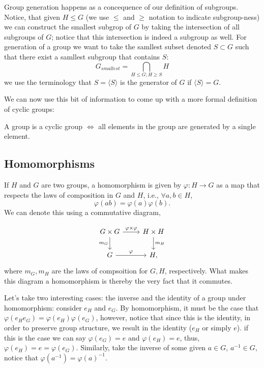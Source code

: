 \documentclass{article}
\begin{document}
\begin{definition}
  Group generation happens as a concequence of our definition of subgroups. Notice, that given \( H \le G \) (we use \( \le\) and \(\ge \) notation to indicate subgroup-ness) we can construct the smallest subgrop of \( G \) by taking the intersection of all subgroups of \( G \); notice that this intersection is indeed a subgroup as well. For generation of a group we want to take the samllest subset denoted \( S \subset G\) such that there exist a samllest subgroup that contains \( S \):
  \begin{displaymath}
    G_{smallest}=\bigcap_{H\le G; H\ge S} H
  \end{displaymath}
  we use the terminology that \( S= \langle S \rangle  \) is the generator of \( G \) if \( \langle S \rangle = G \).
\end{definition}

We can now use this bit of information to come up with a more formal definition of cyclic groups:

\begin{definition}
  A group is a cyclic group \( \iff \) all elements in the group are generated by a single element.
\end{definition}

\subsection{Homomorphisms}
\begin{definition}[Homomorphisms]
  If \( H \) and \( G \) are two groups, a homomorphism is given by \( \varphi : H \to  G \) as a map that respects the laws of composition in \( G \) and \( H \), i.e., \( \forall a,b\in H \),
  \begin{displaymath}
    \varphi (ab)=\varphi (a)\varphi (b).
  \end{displaymath}
  We can denote this using a commutative diagram,

  \[
    \begin{tikzcd}
G \times  G\arrow{r}{\varphi \times  \varphi } \arrow[swap]{d}{m_G} & H \times  H \arrow{d}{m_H} \\%
G \arrow{r}{\varphi}& H,
\end{tikzcd}
\] 
where \( m_G, m_H \) are the laws of compsoition for \( G,H \), respectively. What makes this diagram a homomorphism is thereby the very fact that it commutes. 
\end{definition}

Let's take two interesting cases: the inverse and the identity of a group under homomorphism: consider \( e_H \) and \( e_G \). By homomorphism, it must be the case that \( \varphi (e_He_G)=\varphi (e_H) \varphi (e_G) \), however, notice that since this is the identity, in order to preserve group structure, we result in the identity (\( e_H \) or simply \( e \)). if this is the case we can say \( \varphi (e_G)=e \) and \( \varphi (e_H)=e \), thus, \( \varphi (e_H)=e=\varphi (e_G) \). Similarly, take the inverse of some given \( a \in  G \), \( a^{-1} \in  G \), notice that \( \varphi (a^{-1})=\varphi (a)^{-1} \).
\end{document}

